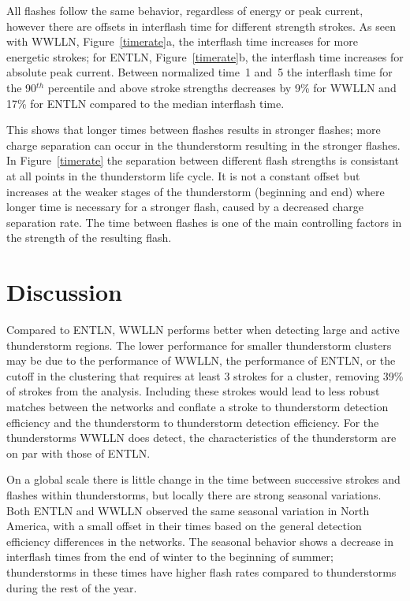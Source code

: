 All flashes follow the same behavior, regardless of energy or peak current, however there are offsets in interflash time for different strength strokes.
As seen with WWLLN, Figure~\ref{timerate}a, the interflash time increases for more energetic strokes; for ENTLN, Figure~\ref{timerate}b, the interflash time increases for absolute peak current.
Between normalized time~1 and~5 the interflash time for the 90$^{th}$ percentile and above stroke strengths decreases by 9\% for WWLLN and 17\% for ENTLN compared to the median interflash time.

This shows that longer times between flashes results in stronger flashes; more charge separation can occur in the thunderstorm resulting in the stronger flashes.
In Figure~\ref{timerate} the separation between different flash strengths is consistant at all points in the thunderstorm life cycle.
It is not a constant offset but increases at the weaker stages of the thunderstorm (beginning and end) where longer time is necessary for a stronger flash, caused by a decreased charge separation rate.
The time between flashes is one of the main controlling factors in the strength of the resulting flash.

\section{Discussion}


Compared to ENTLN, WWLLN performs better when detecting large and active thunderstorm regions.
The lower performance for smaller thunderstorm clusters may be due to the performance of WWLLN, the performance of ENTLN, or the cutoff in the clustering that requires at least 3 strokes for a cluster, removing 39\% of strokes from the analysis.
Including these strokes would lead to less robust matches between the networks and conflate a stroke to thunderstorm detection efficiency and the thunderstorm to thunderstorm detection efficiency.
For the thunderstorms WWLLN does detect, the characteristics of the thunderstorm are on par with those of ENTLN.


On a global scale there is little change in the time between successive strokes and flashes within thunderstorms, but locally there are strong seasonal variations.
Both ENTLN and WWLLN observed the same seasonal variation in North America, with a small offset in their times based on the general detection efficiency differences in the networks.
The seasonal behavior shows a decrease in interflash times from the end of winter to the beginning of summer; thunderstorms in these times have higher flash rates compared to thunderstorms during the rest of the year.

